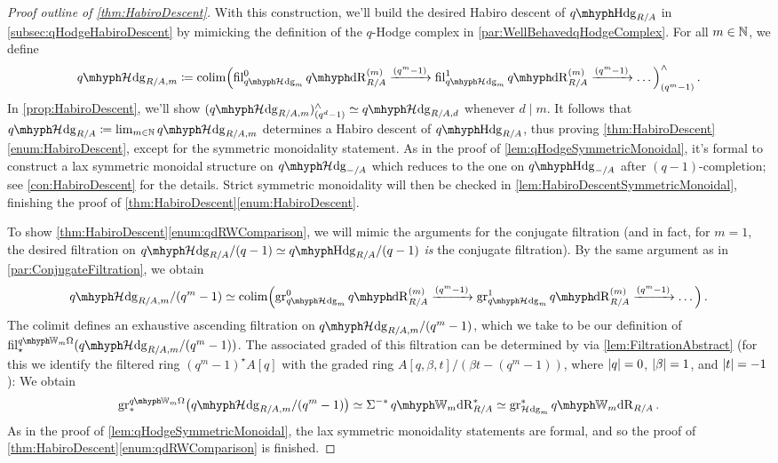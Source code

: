 \documentclass[DIV=12,numbers=enddot,leqno,bibliography=totoc]{scrartcl}
\begin{document}
\begin{proof}[Proof outline of \cref{thm:HabiroDescent}]
		
		With this construction, we'll build the desired Habiro descent of $\qHodge_{R/A}$ in \cref{subsec:qHodgeHabiroDescent} by mimicking the definition of the $q$-Hodge complex in \cref{par:WellBehavedqHodgeComplex}. For all $m\in\mathbb{N}$, we define
		\begin{equation*}
			\qHhodge_{R/A,  m}\coloneqq \colimit\Bigl( \fil_{\qHhodge_m}^{0}\qdeRham_{R/A}^{(m)}\xrightarrow{(q^m-1)} \fil_{\qHhodge_m}^{1}\qdeRham_{R/A}^{(m)}\xrightarrow{(q^m-1)}\dotso\Bigr)_{(q^m-1)}^\complete\,.
		\end{equation*}
		In \cref{prop:HabiroDescent}, we'll show $(\qHhodge_{R/A,  m})_{(q^d-1)}^\complete\simeq \qHhodge_{R/A,  d}$ whenever $d\mid m$. It follows that $\qHhodge_{R/A}\coloneqq \limit_{m\in\IN}\qHhodge_{R/A,  m}$ determines a Habiro descent of $\qHodge_{R/A}$, thus proving \cref{thm:HabiroDescent}\cref{enum:HabiroDescent}, except for the symmetric monoidality statement. As in the proof of \cref{lem:qHodgeSymmetricMonoidal}, it's formal to construct a lax symmetric monoidal structure on $\qHhodge_{-/A}$ which reduces to the one on $\qHodge_{-/A}$ after $(q-1)$-completion; see \cref{con:HabiroDescent} for the details. Strict symmetric monoidality will then be checked in \cref{lem:HabiroDescentSymmetricMonoidal}, finishing the proof of \cref{thm:HabiroDescent}\cref{enum:HabiroDescent}.
		
		To show \cref{thm:HabiroDescent}\cref{enum:qdRWComparison}, we will mimic the arguments for the conjugate filtration (and in fact, for $m=1$, the desired filtration on $\qHhodge_{R/A}/(q-1)\simeq \qHodge_{R/A}/(q-1)$ \emph{is} the conjugate filtration). By the same argument as in \cref{par:ConjugateFiltration}, we obtain
		\begin{equation*}
			\qHhodge_{R/A,  m}/(q^m-1)\simeq \colimit\Bigl(\gr_{\qHhodge_m}^{0}\qdeRham_{R/A}^{(m)}\xrightarrow{(q^m-1)}\gr_{\qHhodge_m}^{1}\qdeRham_{R/A}^{(m)}\xrightarrow{(q^m-1)}\dotso\Bigr)\,.
		\end{equation*}
		The colimit defines an exhaustive ascending filtration on $\qHhodge_{R/A,  m}/(q^m-1)$, which we take to be our definition of $ \fil_\star ^{\qIW_m\Omega}(\qHhodge_{R/A,  m}/(q^m-1))$. The associated graded of this filtration can be determined by via \cref{lem:FiltrationAbstract} (for this we identify the filtered ring $(q^m-1)^\star A[q]$ with the graded ring $A[q,\beta,t]/(\beta t-(q^m-1))$, where $\lvert q\rvert=0$, $\lvert\beta\rvert=1$, and $\lvert t\rvert=-1$): We obtain
		\begin{equation*}
			\gr_*^{\qIW_m\Omega}\bigl(\qHhodge_{R/A,  m}/(q^m-1)\bigr)\simeq \Sigma^{-*}\qIW_m\deRham_{R/A}^*\simeq \gr_{\Hhodge_m}^*\qIW_m\deRham_{R/A}\,.
		\end{equation*}
		As in the proof of \cref{lem:qHodgeSymmetricMonoidal}, the lax symmetric monoidality statements are formal, and so the proof of \cref{thm:HabiroDescent}\cref{enum:qdRWComparison} is finished.
	\end{proof}
	
\end{document}
